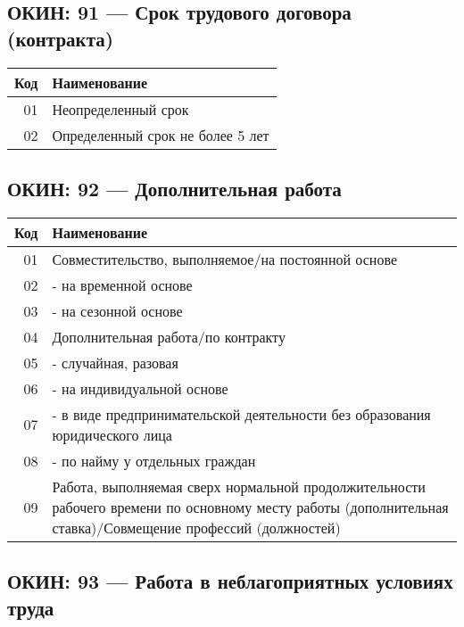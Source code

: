 \documentclass[10pt, a4paper, titlepage]{article}
\begin{document}
\subsection{ОКИН: 91 --- Срок трудового договора (контракта)}

\begin{center}
    \begin{tabular}{rp{}}
        \hline
        \textbf{Код} & \textbf{Наименование} \\ \hline
        01 & Неопределенный срок \\
        02 & Определенный срок не более 5 лет \\
    \end{tabular}
\end{center}

\subsection{ОКИН: 92 --- Дополнительная работа}

\begin{center}
    \begin{tabular}{rp{}}
        \hline
        \textbf{Код} & \textbf{Наименование} \\ \hline
        01 & Совместительство, выполняемое/на постоянной основе \\
        02 & - на временной основе \\
        03 & - на сезонной основе \\
        04 & Дополнительная работа/по контракту \\
        05 & - случайная, разовая \\
        06 & - на индивидуальной основе \\
        07 & - в виде предпринимательской деятельности без образования юридического лица \\
        08 & - по найму у отдельных граждан \\
        09 & Работа, выполняемая сверх нормальной продолжительности рабочего времени по основному месту работы (дополнительная ставка)/Совмещение профессий (должностей) \\
    \end{tabular}
\end{center}

\subsection{ОКИН: 93 --- Работа в неблагоприятных условиях труда}
\end{document}
